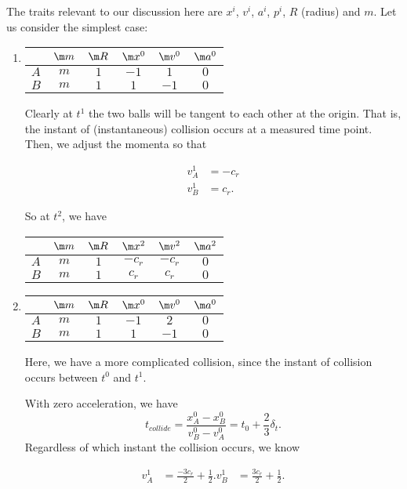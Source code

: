 \documentclass[a4paper,11pt, oneside]{article}
\begin{document}
The traits relevant to our discussion here are $x^i$, $v^i$, $a^i$, $p^i$, $R$ (radius) and $m$.  Let us consider the simplest case:
\begin{enumerate}
    \item 
\begin{tabular}{c|c|c|c|c|c}
   & $\m m$ & $\m R$ & $\m x^0$ & $\m v^0$ & $\m a^0$\\\hline
   $A$ & $m$ & $1$ & $-1$ & $1$ & $0$\\\hline
   $B$ & $m$ & $1$ & $1$ & $-1$ & $0$\\
\end{tabular}

Clearly at $t^1$ the two balls will be tangent to each other at the origin.  That is, the instant of (instantaneous) collision occurs at a measured time point.  Then, we adjust the momenta so that

\begin{align*}
    v_A^1 &= -c_r\\
    v_B^1 &= c_r.
\end{align*}

So at $t^2$, we have 
\begin{tabular}{c|c|c|c|c|c}
   & $\m m$ & $\m R$ & $\m x^2$ & $\m v^2$ & $\m a^2$\\\hline
   $A$ & $m$ & $1$ & $-c_r$ & $-c_r$ & $0$\\\hline
   $B$ & $m$ & $1$ & $c_r$ & $c_r$ & $0$\\
\end{tabular}

\item 
\begin{tabular}{c|c|c|c|c|c}
   & $\m m$ & $\m R$ & $\m x^0$ & $\m v^0$ & $\m a^0$\\\hline
   $A$ & $m$ & $1$ & $-1$ & $2$ & $0$\\\hline
   $B$ & $m$ & $1$ & $1$ & $-1$ & $0$\\
\end{tabular}

Here, we have a more complicated collision, since the instant of collision occurs between $t^0$ and $t^1$.

With zero acceleration, we have
\[
    t_{collide} = \frac{x_A^0 - x_B^0}{v_B^0 - v_A^0} = t_0 + \frac{2}{3}\delta_t.
\]
Regardless of which instant the collision occurs, we know

\begin{align*}
    v_A^1 &= \frac{-3c_r}{2}+\frac{1}{2}.
    v_B^1 &= \frac{3c_r}{2}+\frac{1}{2}.
\end{align*}


\end{enumerate}
\end{document}

